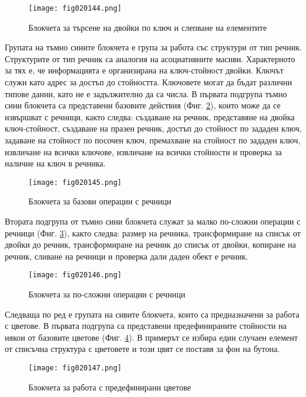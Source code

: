\begin{figure}[H]
  \centering
  \texttt{[image: fig020144.png]}
  \caption{Блокчета за търсене на двойки по ключ и слепване на елементите}
\label{fig020144}
\end{figure}

Групата на тъмно сините блокчета е група за работа със структури от тип речник. Структурите от тип речник са аналогия на асоциативните масиви. Характерното за тях е, че информацията е организирана на ключ-стойност двойки. Ключът служи като адрес за достъп до стойността. Ключовете могат да бъдат различни типове данни, като не е задължително да са числа. В първата подгрупа тъмно сини блокчета са представени базовите действия (Фиг. \ref{fig020145}), които може да се извършват с речници, както следва: създаване на речник, представяне на двойка ключ-стойност, създаване на празен речник, достъп до стойност по зададен ключ, задаване на стойност по посочен ключ, премахване на стойност по зададен ключ, извличане на всички ключове, извличане на всички стойности и проверка за наличие на ключ в речника.

\begin{figure}[H]
  \centering
  \texttt{[image: fig020145.png]}
  \caption{Блокчета за базови операции с речници}
\label{fig020145}
\end{figure}

Втората подгрупа от тъмно сини блокчета служат за малко по-сложни операции с речници (Фиг. \ref{fig020146}), както следва: размер на речника, трансформиране на списък от двойки до речник, трансформиране на речник до списък от двойки, копиране на речник, сливане на речници и проверка дали даден обект е речник.

\begin{figure}[H]
  \centering
  \texttt{[image: fig020146.png]}
  \caption{Блокчета за по-сложни операции с речници}
\label{fig020146}
\end{figure}

Следваща по ред е групата на сивите блокчета, които са предназначени за работа с цветове. В първата подгрупа са представени предефинираните стойности на някои от базовите цветове (Фиг. \ref{fig020147}). В примерът се избира един случаен елемент от списъчна структура с цветовете и този цвят се поставя за фон на бутона.

\begin{figure}[H]
  \centering
  \texttt{[image: fig020147.png]}
  \caption{Блокчета за работа с предефинирани цветове}
\label{fig020147}
\end{figure}

